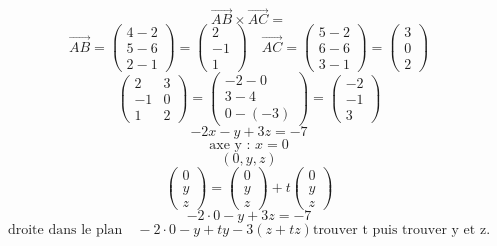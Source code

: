 \documentclass{article}
\begin{document}
\[ \vec{AB} \times \vec{AC} = \]
\[ \vec{AB} = \begin{pmatrix} 4-2 \\ 5-6 \\ 2-1 \end{pmatrix} = \begin{pmatrix} 2 \\ -1 \\ 1 \end{pmatrix} \quad \vec{AC} = \begin{pmatrix} 5-2 \\ 6-6 \\ 3-1 \end{pmatrix} = \begin{pmatrix} 3 \\ 0 \\ 2 \end{pmatrix} \]
\[ \begin{pmatrix} 2 & 3 \\ -1 & 0 \\ 1 & 2 \end{pmatrix} = \begin{pmatrix} -2 - 0 \\ 3 - 4 \\ 0 - (-3) \end{pmatrix} = \begin{pmatrix} -2 \\ -1 \\ 3 \end{pmatrix} \]
\[ -2x - y + 3z = -7 \]
\[ \text{axe y : } x=0 \]
\[ (0, y, z) \]
\[ \begin{pmatrix} 0 \\ y \\ z \end{pmatrix} = \begin{pmatrix} 0 \\ y \\ z \end{pmatrix} + t \begin{pmatrix} 0 \\ y \\ z \end{pmatrix} \]
\[ -2 \cdot 0 - y + 3z = -7 \]
\[ \text{droite dans le plan} \quad -2 \cdot 0 - y + ty - 3(z+tz) \text{trouver t puis trouver y et z.} \]
\end{document}
